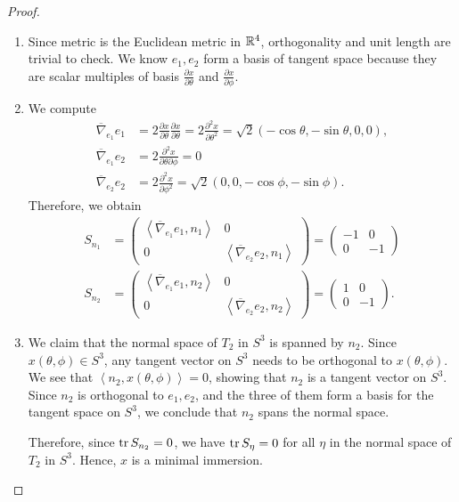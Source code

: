 \documentclass[12pt]{article}
\begin{document}
\begin{proof}
\begin{enumerate}[label=(\alph*)]
	\item Since metric is the Euclidean metric in $ \mathbb{R}^{4}$, orthogonality and unit length are trivial to check. We know $ e_1,e_2$ form a basis of tangent space because they are scalar multiples of basis $ \frac{\partial x}{\partial \theta} $ and $ \frac{\partial x}{\partial \phi} $. 
	\item We compute
	\begin{align*}
		\overline{\nabla}_{e_1} e_1 &= 2 \frac{\partial x}{\partial \theta} \frac{\partial x}{\partial \theta} = 2 \frac{\partial^2 x}{\partial { \theta}^2}  = \sqrt{2} (- \cos \theta, - \sin \theta,0,0),\\
		\overline{\nabla}_{e_1}e_2 &= 2 \frac{\partial^2 x}{\partial { \theta} \partial \phi}  =0\\
		\overline{\nabla}_{e_2} e_2&= 2 \frac{\partial^2 x}{\partial { \phi}^2} = \sqrt{2} (0,0,-\cos \phi, - \sin \phi) .
	\end{align*}
	Therefore, we obtain
\begin{align*}
	S_{n_1} &= \begin{pmatrix} \left\langle \overline{\nabla}_{e_1} e_1, n_1 \right\rangle &  0\\ 0& \left\langle \overline{\nabla}_{e_2} e_2, n_1 \right\rangle \end{pmatrix} = \begin{pmatrix} -1&0\\0&-1 \end{pmatrix}   \\
	S_{n_2} &= \begin{pmatrix} \left\langle \overline{\nabla}_{e_1} e_1, n_2 \right\rangle &  0\\ 0& \left\langle \overline{\nabla}_{e_2} e_2, n_2 \right\rangle \end{pmatrix} = \begin{pmatrix} 1&0\\0&-1 \end{pmatrix}   .
\end{align*}
\item We claim that the normal space of $ T_2$ in $ S^3$ is spanned by $ n_2$. Since $ x(\theta,\phi) \in S^3$, any tangent vector on $ S^3$ needs to be orthogonal to $ x(\theta,\phi)$. We see that $ \left\langle n_2, x(\theta,\phi) \right\rangle = 0$, showing that $ n_2$ is a tangent vector on $ S^3$. Since $ n_2$ is orthogonal to $ e_1,e_2$, and the three of them form a basis for the tangent space on $ S^3$, we conclude that $ n_2$ spans the normal space.

Therefore, since $ \operatorname{tr} S_{n_2} = 0$, we have $ \operatorname{tr} S_{\eta} = 0$ for all $ \eta $ in the normal space of $ T_2$ in $ S^3$. Hence, $ x$ is a minimal immersion.
\end{enumerate}
\end{proof}
\end{document}
